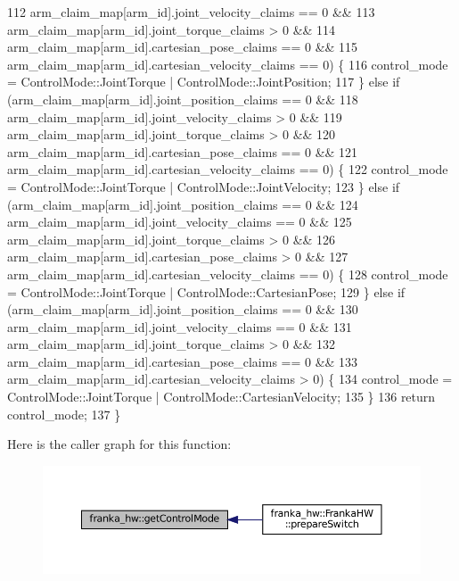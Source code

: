 \begin{DoxyCode}
112              arm\_claim\_map[arm\_id].joint\_velocity\_claims == 0 &&
113              arm\_claim\_map[arm\_id].joint\_torque\_claims > 0 &&
114              arm\_claim\_map[arm\_id].cartesian\_pose\_claims == 0 &&
115              arm\_claim\_map[arm\_id].cartesian\_velocity\_claims == 0) \{
116     control\_mode = ControlMode::JointTorque | ControlMode::JointPosition;
117   \} \textcolor{keywordflow}{else} \textcolor{keywordflow}{if} (arm\_claim\_map[arm\_id].joint\_position\_claims == 0 &&
118              arm\_claim\_map[arm\_id].joint\_velocity\_claims > 0 &&
119              arm\_claim\_map[arm\_id].joint\_torque\_claims > 0 &&
120              arm\_claim\_map[arm\_id].cartesian\_pose\_claims == 0 &&
121              arm\_claim\_map[arm\_id].cartesian\_velocity\_claims == 0) \{
122     control\_mode = ControlMode::JointTorque | ControlMode::JointVelocity;
123   \} \textcolor{keywordflow}{else} \textcolor{keywordflow}{if} (arm\_claim\_map[arm\_id].joint\_position\_claims == 0 &&
124              arm\_claim\_map[arm\_id].joint\_velocity\_claims == 0 &&
125              arm\_claim\_map[arm\_id].joint\_torque\_claims > 0 &&
126              arm\_claim\_map[arm\_id].cartesian\_pose\_claims > 0 &&
127              arm\_claim\_map[arm\_id].cartesian\_velocity\_claims == 0) \{
128     control\_mode = ControlMode::JointTorque | ControlMode::CartesianPose;
129   \} \textcolor{keywordflow}{else} \textcolor{keywordflow}{if} (arm\_claim\_map[arm\_id].joint\_position\_claims == 0 &&
130              arm\_claim\_map[arm\_id].joint\_velocity\_claims == 0 &&
131              arm\_claim\_map[arm\_id].joint\_torque\_claims > 0 &&
132              arm\_claim\_map[arm\_id].cartesian\_pose\_claims == 0 &&
133              arm\_claim\_map[arm\_id].cartesian\_velocity\_claims > 0) \{
134     control\_mode = ControlMode::JointTorque | ControlMode::CartesianVelocity;
135   \}
136   \textcolor{keywordflow}{return} control\_mode;
137 \}
\end{DoxyCode}
Here is the caller graph for this function\+:
\nopagebreak
\begin{figure}[H]
\begin{center}
\leavevmode
\includegraphics[width=350pt]{namespacefranka__hw_a21fc3cb90700f7fc2b9b9a93c2d40d0a_icgraph}
\end{center}
\end{figure}
\mbox{\label{namespacefranka__hw_a6c621829dd30c8ff939de6ae0861966d}} 
